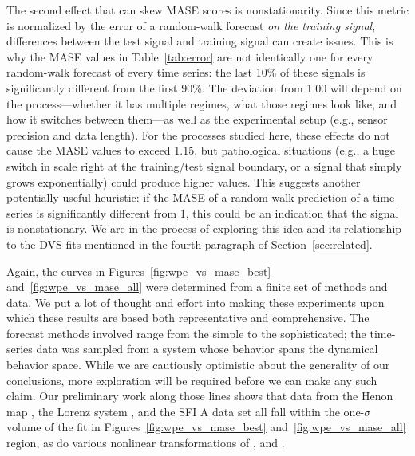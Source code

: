 
The second effect that can skew MASE scores is nonstationarity.  Since
this metric is normalized by the error of a random-walk forecast
\emph{on the training signal}, differences between the test signal and
training signal can create issues.  This is why the MASE values in
Table~\ref{tab:error} are not identically one for every random-walk
forecast of every time series: the last 10\% of these signals is
significantly different from the first 90\%.  The deviation from 1.00
will depend on the process---whether it has multiple regimes, what
those regimes look like, and how it switches between them---as well as
the experimental setup (e.g., sensor precision and data length).  For
the processes studied here, these effects do not cause the MASE values
to exceed 1.15, but pathological situations (e.g., a huge switch in
scale right at the training/test signal boundary, or a signal that
simply grows exponentially) could produce higher values.  This
suggests another potentially useful heuristic: if the MASE of a
random-walk prediction of a time series is significantly different
from 1, this could be an indication that the signal is nonstationary.
We are in the process of exploring this idea and its relationship to
the DVS fits mentioned in the fourth paragraph of
Section~\ref{sec:related}.

Again, the curves in Figures~\ref{fig:wpe_vs_mase_best}
and~\ref{fig:wpe_vs_mase_all} were determined from a finite set of
methods and data.  We put a lot of thought and effort into making
these experiments upon which these results are based both
representative and comprehensive.  The forecast methods involved range
from the simple to the sophisticated; the time-series data was sampled
from a system whose behavior spans the dynamical behavior space.
While we are cautiously optimistic about the generality of our
conclusions, more exploration will be required before we can make any
such claim.  Our preliminary work along those lines shows that data
from the Henon map \cite{henon}, the Lorenz system \cite{lorenz}, and
the SFI A data set \cite{weigend-book,sfi-data} all fall within the
one-$\sigma$ volume of the fit in Figures~\ref{fig:wpe_vs_mase_best}
and~\ref{fig:wpe_vs_mase_all} region, as do various nonlinear
transformations of \svdtwo, \svdfive and \svdsix.

